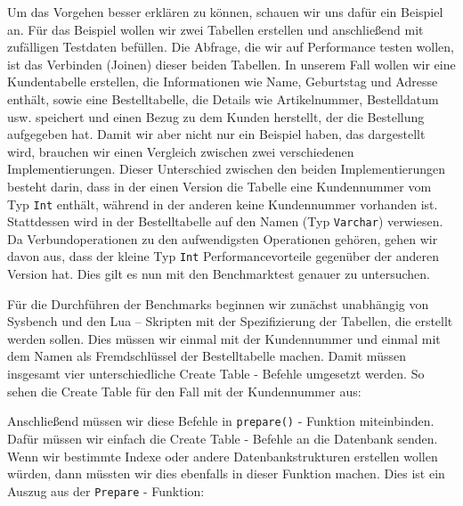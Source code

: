 Um das Vorgehen besser erklären zu können, schauen wir uns dafür ein Beispiel an.
Für das Beispiel wollen wir zwei Tabellen erstellen und anschließend mit zufälligen Testdaten befüllen.
Die Abfrage, die wir auf Performance testen wollen, ist das Verbinden (Joinen) dieser beiden Tabellen.
In unserem Fall wollen wir eine Kundentabelle erstellen, die Informationen wie Name, Geburtstag und Adresse enthält, sowie eine Bestelltabelle, die Details wie Artikelnummer, Bestelldatum usw. speichert und einen Bezug zu dem Kunden herstellt, der die Bestellung aufgegeben hat.
Damit wir aber nicht nur ein Beispiel haben, das dargestellt wird, brauchen wir einen Vergleich zwischen zwei verschiedenen Implementierungen.
Dieser Unterschied zwischen den beiden Implementierungen besteht darin, dass in der einen Version die Tabelle eine Kundennummer vom Typ \texttt{Int} enthält, während in der anderen keine Kundennummer vorhanden ist.
Stattdessen wird in der Bestelltabelle auf den Namen (Typ \texttt{Varchar}) verwiesen.
Da Verbundoperationen zu den aufwendigsten Operationen gehören, gehen wir davon aus, dass der kleine Typ \texttt{Int} Performancevorteile gegenüber der anderen Version hat.
Dies gilt es nun mit den Benchmarktest genauer zu untersuchen.

Für die Durchführen der Benchmarks beginnen wir zunächst unabhängig von Sysbench und den Lua – Skripten mit der Spezifizierung der Tabellen, die erstellt werden sollen.
Dies müssen wir einmal mit der Kundennummer und einmal mit dem Namen als Fremdschlüssel der Bestelltabelle machen.
Damit müssen insgesamt vier unterschiedliche Create Table - Befehle umgesetzt werden.
So sehen die Create Table für den Fall mit der Kundennummer aus:





Anschließend müssen wir diese Befehle in \texttt{prepare()} - Funktion miteinbinden.
Dafür müssen wir einfach die Create Table - Befehle an die Datenbank senden.
Wenn wir bestimmte Indexe oder andere Datenbankstrukturen erstellen wollen würden, dann müssten wir dies ebenfalls in dieser Funktion machen.
Dies ist ein Auszug aus der \texttt{Prepare} - Funktion:


